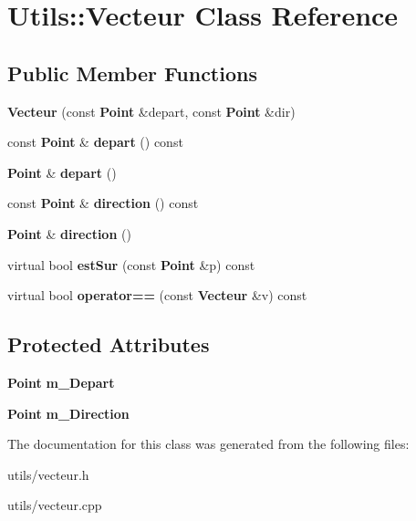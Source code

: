 \section{\-Utils\-:\-:\-Vecteur \-Class \-Reference}
\label{class_utils_1_1_vecteur}
\subsection*{\-Public \-Member \-Functions}
\begin{DoxyCompactItemize}
\item 
{\bfseries \-Vecteur} (const {\bf \-Point} \&depart, const {\bf \-Point} \&dir)\label{class_utils_1_1_vecteur_a2684bf69bcdccceb57174e944ec64a2a}

\item 
const {\bf \-Point} \& {\bfseries depart} () const \label{class_utils_1_1_vecteur_a07158bb676ca4096c3fb76577b3a2d11}

\item 
{\bf \-Point} \& {\bfseries depart} ()\label{class_utils_1_1_vecteur_aa7c8d6b06796af02f5a79d49c973c4fa}

\item 
const {\bf \-Point} \& {\bfseries direction} () const \label{class_utils_1_1_vecteur_a5900c25f8147611ef9dbe61c4b185e05}

\item 
{\bf \-Point} \& {\bfseries direction} ()\label{class_utils_1_1_vecteur_ac3ae1b3219aa66e978b3c1c0ab2aa1ce}

\item 
virtual bool {\bfseries est\-Sur} (const {\bf \-Point} \&p) const \label{class_utils_1_1_vecteur_a1047a63526b60d4b6ba109ef90461b96}

\item 
virtual bool {\bfseries operator==} (const {\bf \-Vecteur} \&v) const \label{class_utils_1_1_vecteur_aa63a24512c64d431581234c1b495cde3}

\end{DoxyCompactItemize}
\subsection*{\-Protected \-Attributes}
\begin{DoxyCompactItemize}
\item 
{\bf \-Point} {\bfseries m\-\_\-\-Depart}\label{class_utils_1_1_vecteur_ac06aca3aaffdcfc5933f831a2689a9be}

\item 
{\bf \-Point} {\bfseries m\-\_\-\-Direction}\label{class_utils_1_1_vecteur_a00fe23c566be4a2223712157cd029d75}

\end{DoxyCompactItemize}


\-The documentation for this class was generated from the following files\-:\begin{DoxyCompactItemize}
\item 
utils/vecteur.\-h\item 
utils/vecteur.\-cpp\end{DoxyCompactItemize}
